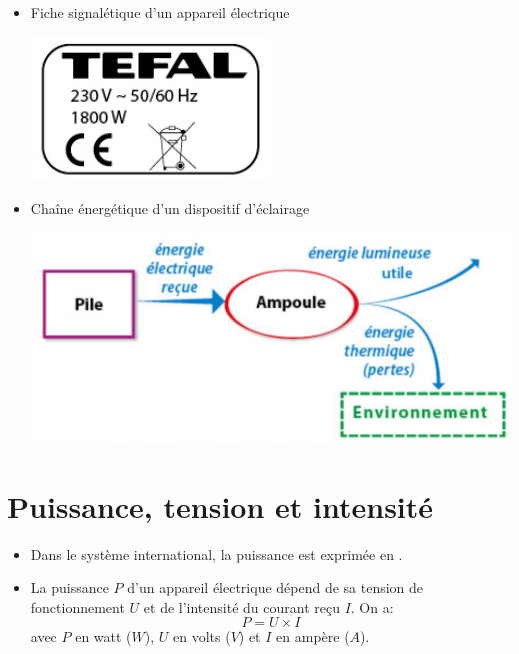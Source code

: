 \documentclass[12pt,a4paper]{article}
\begin{document}
\begin{myex}
	\begin{itemize}
		\item Fiche signalétique d'un appareil électrique
		
		\begin{center}
			\includegraphics[scale=0.7]{fiche}
		\end{center}
		
		\item Chaîne énergétique d'un dispositif d'éclairage
		
		\begin{center}
			\includegraphics[scale=0.4]{chaine}
		\end{center}
	\end{itemize}

	
\end{myex}


\section{Puissance, tension et intensité}


\begin{mybilan}
	\begin{itemize}
		\item Dans le système international, la puissance est exprimée en .
		\item La puissance $P$ d'un appareil électrique dépend de sa tension de fonctionnement $U$ et de l'intensité du courant reçu $I$. On a: 
		\begin{equation*}
			P = U \times I
		\end{equation*}
	avec $P$ en watt ($W$), $U$ en volts ($V$) et $I$ en ampère ($A$).
	\end{itemize}
		
		 
\end{mybilan}
\end{document}
